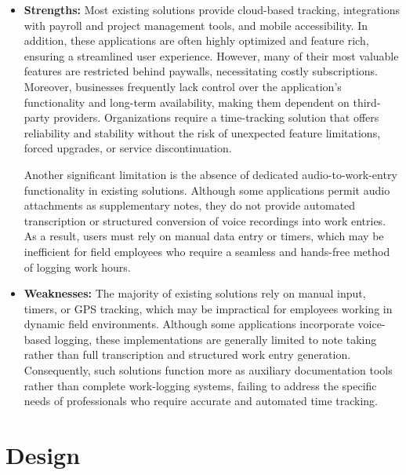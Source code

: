 \documentclass[
  digital,     %
  oneside,     %
  nosansbold,  %
  nocolorbold, %
  lof,         %
  lot,         %
]{fithesis4}
\begin{document}
\begin{itemize}  
    \item \textbf{Strengths:} Most existing solutions provide cloud-based tracking, integrations with payroll and project management tools, and mobile accessibility. In addition, these applications are often highly optimized and feature rich, ensuring a streamlined user experience. However, many of their most valuable features are restricted behind paywalls, necessitating costly subscriptions. Moreover, businesses frequently lack control over the application's functionality and long-term availability, making them dependent on third-party providers. Organizations require a time-tracking solution that offers reliability and stability without the risk of unexpected feature limitations, forced upgrades, or service discontinuation.  

    Another significant limitation is the absence of dedicated audio-to-work-entry functionality in existing solutions. Although some applications permit audio attachments as supplementary notes, they do not provide automated transcription or structured conversion of voice recordings into work entries. As a result, users must rely on manual data entry or timers, which may be inefficient for field employees who require a seamless and hands-free method of logging work hours.  

    \item \textbf{Weaknesses:} The majority of existing solutions rely on manual input, timers, or GPS tracking, which may be impractical for employees working in dynamic field environments. Although some applications incorporate voice-based logging, these implementations are generally limited to note taking rather than full transcription and structured work entry generation. Consequently, such solutions function more as auxiliary documentation tools rather than complete work-logging systems, failing to address the specific needs of professionals who require accurate and automated time tracking.

\end{itemize}

\shorthandoff{-}
\begin{markdown}
\end{markdown}
\shorthandon{-}

\chapter{Design}
\end{document}
